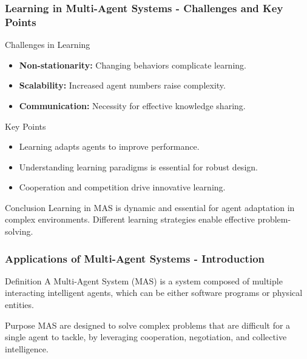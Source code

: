 \documentclass[aspectratio=169]{beamer}
\begin{document}
\begin{frame}[fragile]
    \frametitle{Learning in Multi-Agent Systems - Challenges and Key Points}
    \begin{block}{Challenges in Learning}
        \begin{itemize}
            \item \textbf{Non-stationarity:} Changing behaviors complicate learning.
            \item \textbf{Scalability:} Increased agent numbers raise complexity.
            \item \textbf{Communication:} Necessity for effective knowledge sharing.
        \end{itemize}
    \end{block}

    \begin{block}{Key Points}
        \begin{itemize}
            \item Learning adapts agents to improve performance.
            \item Understanding learning paradigms is essential for robust design.
            \item Cooperation and competition drive innovative learning.
        \end{itemize}
    \end{block}

    \begin{block}{Conclusion}
        Learning in MAS is dynamic and essential for agent adaptation in complex environments. Different learning strategies enable effective problem-solving.
    \end{block}
\end{frame}

\begin{frame}[fragile]
    \frametitle{Applications of Multi-Agent Systems - Introduction}
    \begin{block}{Definition}
        A Multi-Agent System (MAS) is a system composed of multiple interacting intelligent agents, which can be either software programs or physical entities.
    \end{block}
    \begin{block}{Purpose}
        MAS are designed to solve complex problems that are difficult for a single agent to tackle, by leveraging cooperation, negotiation, and collective intelligence.
    \end{block}
\end{frame}
\end{document}
